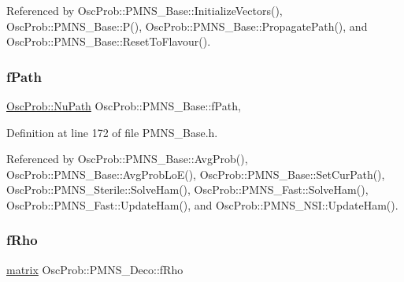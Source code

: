 Referenced by Osc\+Prob\+::\+P\+M\+N\+S\+\_\+\+Base\+::\+Initialize\+Vectors(), Osc\+Prob\+::\+P\+M\+N\+S\+\_\+\+Base\+::\+P(), Osc\+Prob\+::\+P\+M\+N\+S\+\_\+\+Base\+::\+Propagate\+Path(), and Osc\+Prob\+::\+P\+M\+N\+S\+\_\+\+Base\+::\+Reset\+To\+Flavour().

\mbox{\label{classOscProb_1_1PMNS__Base_a849437aa8891fe042e86886ce8f81c6e}} 
\subsubsection{\texorpdfstring{f\+Path}{fPath}}
{\footnotesize\ttfamily \hyperlink{structOscProb_1_1NuPath}{Osc\+Prob\+::\+Nu\+Path} Osc\+Prob\+::\+P\+M\+N\+S\+\_\+\+Base\+::f\+Path\hspace{0.3cm}{\ttfamily [protected]}, {\ttfamily [inherited]}}



Definition at line 172 of file P\+M\+N\+S\+\_\+\+Base.\+h.



Referenced by Osc\+Prob\+::\+P\+M\+N\+S\+\_\+\+Base\+::\+Avg\+Prob(), Osc\+Prob\+::\+P\+M\+N\+S\+\_\+\+Base\+::\+Avg\+Prob\+Lo\+E(), Osc\+Prob\+::\+P\+M\+N\+S\+\_\+\+Base\+::\+Set\+Cur\+Path(), Osc\+Prob\+::\+P\+M\+N\+S\+\_\+\+Sterile\+::\+Solve\+Ham(), Osc\+Prob\+::\+P\+M\+N\+S\+\_\+\+Fast\+::\+Solve\+Ham(), Osc\+Prob\+::\+P\+M\+N\+S\+\_\+\+Fast\+::\+Update\+Ham(), and Osc\+Prob\+::\+P\+M\+N\+S\+\_\+\+N\+S\+I\+::\+Update\+Ham().

\mbox{\label{classOscProb_1_1PMNS__Deco_a0488d62b4ef4cf5b43425769f5fcdbdf}} 
\subsubsection{\texorpdfstring{f\+Rho}{fRho}}
{\footnotesize\ttfamily \hyperlink{classOscProb_1_1PMNS__Deco_a77b4e0c041b6268910a270be0f5387c9}{matrix} Osc\+Prob\+::\+P\+M\+N\+S\+\_\+\+Deco\+::f\+Rho\hspace{0.3cm}{\ttfamily [protected]}}



